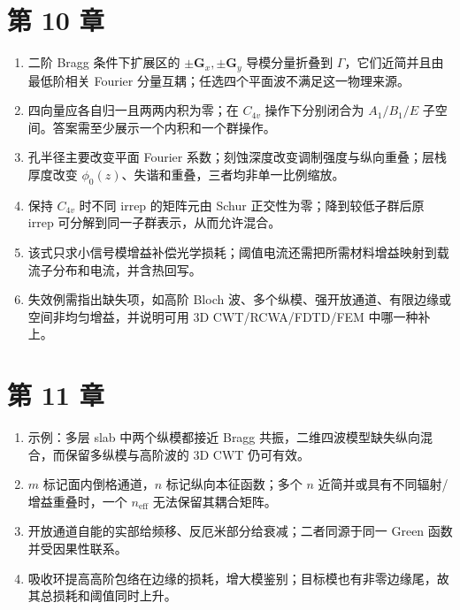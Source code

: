 \section{第 10 章}
\begin{enumerate}
  \item 二阶 Bragg 条件下扩展区的 $\pm\bm G_x,\pm\bm G_y$ 导模分量折叠到 $\Gamma$，它们近简并且由最低阶相关 Fourier 分量互耦；任选四个平面波不满足这一物理来源。
  \item 四向量应各自归一且两两内积为零；在 $C_{4v}$ 操作下分别闭合为 $A_1/B_1/E$ 子空间。答案需至少展示一个内积和一个群操作。
  \item 孔半径主要改变平面 Fourier 系数；刻蚀深度改变调制强度与纵向重叠；层栈厚度改变 $\phi_0(z)$、失谐和重叠，三者均非单一比例缩放。
  \item 保持 $C_{4v}$ 时不同 irrep 的矩阵元由 Schur 正交性为零；降到较低子群后原 irrep 可分解到同一子群表示，从而允许混合。
  \item 该式只求小信号模增益补偿光学损耗；阈值电流还需把所需材料增益映射到载流子分布和电流，并含热回写。
  \item 失效例需指出缺失项，如高阶 Bloch 波、多个纵模、强开放通道、有限边缘或空间非均匀增益，并说明可用 3D CWT/RCWA/FDTD/FEM 中哪一种补上。
\end{enumerate}

\section{第 11 章}
\begin{enumerate}
  \item 示例：多层 slab 中两个纵模都接近 Bragg 共振，二维四波模型缺失纵向混合，而保留多纵模与高阶波的 3D CWT 仍可有效。
  \item $m$ 标记面内倒格通道，$n$ 标记纵向本征函数；多个 $n$ 近简并或具有不同辐射/增益重叠时，一个 $n_{\mathrm{eff}}$ 无法保留其耦合矩阵。
  \item 开放通道自能的实部给频移、反厄米部分给衰减；二者同源于同一 Green 函数并受因果性联系。
  \item 吸收环提高高阶包络在边缘的损耗，增大模鉴别；目标模也有非零边缘尾，故其总损耗和阈值同时上升。
\end{enumerate}


